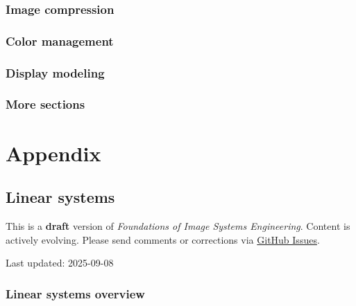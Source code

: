 \documentclass[
  letterpaper,
]{book}
\begin{document}
\section{Image compression}\label{image-compression}

\section{Color management}\label{color-management}

\section{Display modeling}\label{display-modeling}

\section{More sections}\label{more-sections}

\part{Appendix}

\chapter{Linear systems}\label{sec-appendix-linear-systems}

\begin{tcolorbox}[enhanced jigsaw, opacityback=0, breakable, coltitle=black, leftrule=.75mm, left=2mm, colframe=quarto-callout-warning-color-frame, opacitybacktitle=0.6, bottomtitle=1mm, bottomrule=.15mm, toprule=.15mm, title=\textcolor{quarto-callout-warning-color}{\faExclamationTriangle}\hspace{0.5em}{Work in Progress}, titlerule=0mm, toptitle=1mm, colback=white, rightrule=.15mm, colbacktitle=quarto-callout-warning-color!10!white, arc=.35mm]

This is a \textbf{draft} version of \emph{Foundations of Image Systems
Engineering}. Content is actively evolving. Please send comments or
corrections via \href{https://github.com/wandell/FISE-git/issues}{GitHub
Issues}.

Last updated: 2025-09-08

\end{tcolorbox}

\section{Linear systems
overview}\label{sec-appendix-linear-systems-overview}
\end{document}
